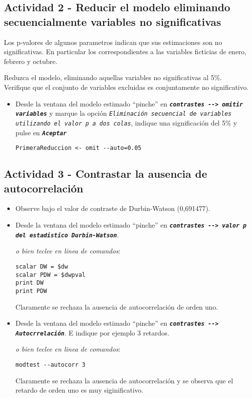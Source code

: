 \documentclass[11pt]{article}
\begin{document}
\subsection{Actividad 2 - Reducir el modelo eliminando secuencialmente variables no significativas}
\label{sec:org50de869}

Los p-valores de algunos parametros indican que sus estimaciones son
no significativas. En particular los correspondientes a las variables
ficticias de enero, febrero y octubre.

Reduzca el modelo, eliminando aquellas variables no significativas al
5\%. Verifique que el conjunto de variables excluidas es conjuntamente
no significativo.

\begin{itemize}
\item Desde la ventana del modelo estimado ``pinche'' en \textbf{\emph{\texttt{contrastes -{}->
  omitir variables}}} y marque la opción \emph{\texttt{Eliminación secuencial de
  variables utilizando el valor p a dos colas}}, indique una
significación del 5\% y pulse en \textbf{\emph{\texttt{Aceptar}}}
{\vspace{0pt} \footnotesize \color{gray!70!black}
\begin{verbatim}
PrimeraReduccion <- omit --auto=0.05
\end{verbatim}
}
\end{itemize}


\subsection{Actividad 3 - Contrastar la ausencia de autocorrelación}
\label{sec:org8b29207}

\begin{itemize}
\item Observe bajo el valor de contraste de Durbin-Watson (0,691477).

\item Desde la ventana del modelo estimado ``pinche'' en \textbf{\emph{\texttt{contrastes -{}->
  valor p del estadistico Durbin-Watson}}}. 
{\vspace{0pt} \footnotesize \color{gray!70!black}
\emph{o bien teclee en linea de comandos}:
\begin{verbatim}
scalar DW = $dw
scalar PDW = $dwpval
print DW
print PDW
\end{verbatim}
}

Claramente se rechaza la ausencia de autocorrelación de orden uno.

\item Desde la ventana del modelo estimado ``pinche'' en \textbf{\emph{\texttt{contrastes -{}->
  Autocrrelación}}}. E indique por ejemplo 3 retardos. 
{\vspace{0pt} \footnotesize \color{gray!70!black}
\emph{o bien teclee en linea de comandos}:
\begin{verbatim}
modtest --autocorr 3
\end{verbatim}
}

Claramente se rechaza la ausencia de autocorrelación y se observa
que el retardo de orden uno es muy siginificativo.
\end{itemize}
\end{document}
